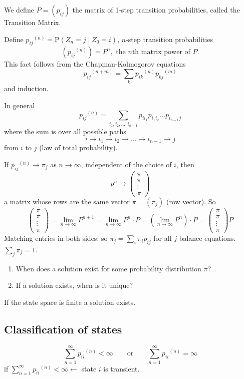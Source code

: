 \documentclass[english,12pt]{article}
\theoremstyle{plain}
\theoremstyle{definition}
\theoremstyle{definition} %
\newcommand{\enum}[1]{\begin{enumerate} #1 \end{enumerate}}
\begin{document}
We define $P = (p_{ij})$ the matrix of 1-step transition probabilities, called the Transition Matrix.

Define ${p_{ij}}^{(n)} = \text{P}(Z_n = j \mid Z_0 = i)$, $n$-step transition probabilities
\[ ({p_{ij}}^{(n)}) = P^n, \text{ the $n$th matrix power of $P$}. \]
This fact follows from the Chapman-Kolmogorov equations
\[ {p_{ij}}^{(n+m)} = \sum_k {p_{ik}}^{(n)} {p_{kj}}^{(m)} \]
and induction.

In general
\[ {p_{ij}}^{(n)} = \sum_{i_1, i_2, \ldots, i_{n-1}} p_{ii_1}p_{i_1i_2}\ldots p_{i_{n-1}j} \]
where the sum is over all possible paths
\[ i \to i_1 \to i_2 \to \ldots \to i_{n-1} \to j \]
from $i$ to $j$ (law of total probability).

If ${p_{ij}}^{(n)} \to \pi_j$ as $n \to \infty$, independent of the choice of $i$, then
\[ p^n \to \begin{pmatrix} \pi \\ \pi \\ \vdots \\ \pi \end{pmatrix} \]
a matrix whose rows are the same vector $\pi = (\pi_j)$ (row vector). So
\[ \begin{pmatrix} \pi \\ \pi \\ \vdots \\ \pi \end{pmatrix} = \lim_{n \to \infty} P^{n+1} = \lim_{n \to \infty} P^n \cdot P = \left( \lim_{n \to \infty} P^n \right) \cdot P = \begin{pmatrix} \pi \\ \pi \\ \vdots \\ \pi \end{pmatrix} P \]
Matching entries in both sides: so $\pi_j = \sum_i \pi_i p_{ij}$ for all $j$ balance equations. $\sum_j \pi_j = 1$.

\enum{
\item When does a solution exist for some probability distribution $\pi$?
\item If a solution exists, when is it unique?
}

If the state space is finite a solution exists.

\subsection{Classification of states}
\[ \sum_{n=1}^\infty {p_{ii}}^{(n)} < \infty \qquad \text{or} \qquad \sum_{n=1}^\infty {p_{ii}}^{(n)} = \infty \]
if $\sum_{n=1}^\infty {p_{ii}}^{(n)} < \infty \leftarrow$ state $i$ is transient. 
\end{document}
